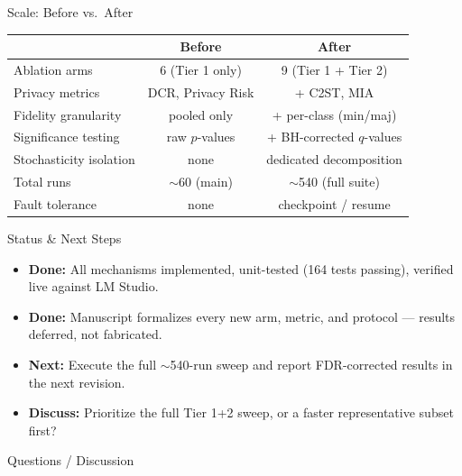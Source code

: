 \documentclass[aspectratio=169, 11pt]{beamer}
\begin{document}
\begin{frame}{Scale: Before vs.\ After}
\centering
\footnotesize
\begin{tabular}{lcc}
\toprule
 & \textbf{Before} & \textbf{After} \\
\midrule
Ablation arms          & 6 (Tier 1 only)      & 9 (Tier 1 + Tier 2) \\
Privacy metrics        & DCR, Privacy Risk    & + C2ST, MIA \\
Fidelity granularity   & pooled only          & + per-class (min/maj) \\
Significance testing   & raw $p$-values       & + BH-corrected $q$-values \\
Stochasticity isolation & none                & dedicated decomposition \\
Total runs             & $\sim$60 (main)      & $\sim$540 (full suite) \\
Fault tolerance        & none                 & checkpoint / resume \\
\bottomrule
\end{tabular}
\end{frame}

\begin{frame}{Status \& Next Steps}
\begin{itemize}
\item \textcolor{accentgreen}{\textbf{Done:}} All mechanisms implemented, unit-tested (164 tests passing), verified live against LM Studio.
\item \textcolor{accentgreen}{\textbf{Done:}} Manuscript formalizes every new arm, metric, and protocol --- results deferred, not fabricated.
\item \textcolor{accentorange}{\textbf{Next:}} Execute the full $\sim$540-run sweep and report FDR-corrected results in the next revision.
\item \textcolor{accentorange}{\textbf{Discuss:}} Prioritize the full Tier 1+2 sweep, or a faster representative subset first?
\end{itemize}
\end{frame}

\begin{frame}
\centering
\Large Questions / Discussion
\end{frame}
\end{document}
